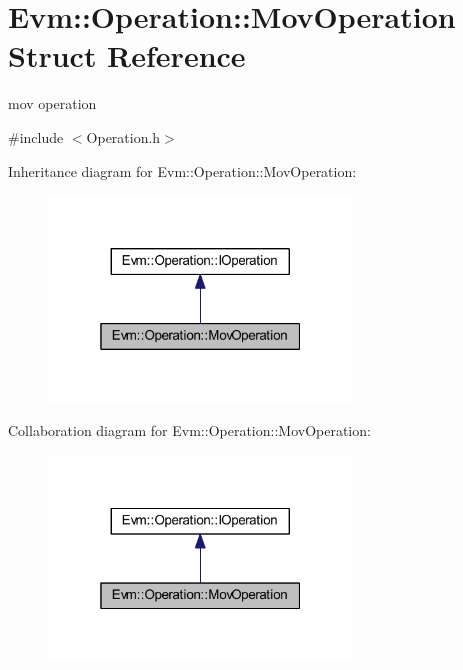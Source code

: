 \hypertarget{struct_evm_1_1_operation_1_1_mov_operation}{}\section{Evm\+:\+:Operation\+:\+:Mov\+Operation Struct Reference}
\label{struct_evm_1_1_operation_1_1_mov_operation}


mov operation  




{\ttfamily \#include $<$Operation.\+h$>$}



Inheritance diagram for Evm\+:\+:Operation\+:\+:Mov\+Operation\+:
\nopagebreak
\begin{figure}[H]
\begin{center}
\leavevmode
\includegraphics[width=229pt]{struct_evm_1_1_operation_1_1_mov_operation__inherit__graph}
\end{center}
\end{figure}


Collaboration diagram for Evm\+:\+:Operation\+:\+:Mov\+Operation\+:
\nopagebreak
\begin{figure}[H]
\begin{center}
\leavevmode
\includegraphics[width=229pt]{struct_evm_1_1_operation_1_1_mov_operation__coll__graph}
\end{center}
\end{figure}
